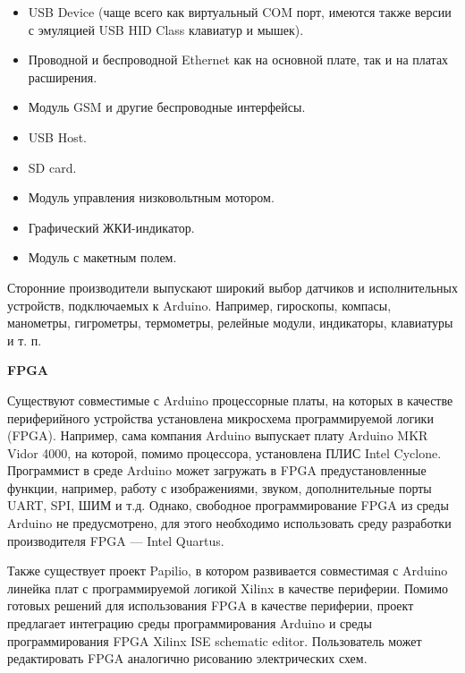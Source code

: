 \documentclass[12pt, oneside]{altsu-report}
\begin{document}
\begin{itemize}
    \item USB Device (чаще всего как виртуальный COM порт, имеются также версии с эмуляцией USB HID Class клавиатур и мышек).

    \item Проводной и беспроводной Ethernet как на основной плате, так и на платах расширения.

    \item Модуль GSM и другие беспроводные интерфейсы.

    \item USB Host.

    \item SD card.

    \item Модуль управления низковольтным мотором.

    \item Графический ЖКИ-индикатор.

    \item Модуль с макетным полем.
\end{itemize}

Сторонние производители выпускают широкий выбор датчиков и исполнительных устройств, подключаемых к Arduino. Например, гироскопы, компасы, манометры, гигрометры, термометры, релейные модули, индикаторы, клавиатуры и т. п.

\begin{center}
    \textbf{FPGA}
\end{center}

Существуют совместимые с Arduino процессорные платы, на которых в качестве периферийного устройства установлена микросхема программируемой логики (FPGA). Например, сама компания Arduino выпускает плату Arduino MKR Vidor 4000, на которой, помимо процессора, установлена ПЛИС Intel Cyclone. Программист в среде Arduino может загружать в FPGA предустановленные функции, например, работу с изображениями, звуком, дополнительные порты UART, SPI, ШИМ и т.д. Однако, свободное программирование FPGA из среды Arduino не предусмотрено, для этого необходимо использовать среду разработки производителя FPGA --- Intel Quartus.

Также существует проект Papilio, в котором развивается совместимая с Arduino линейка плат с программируемой логикой Xilinx в качестве периферии. Помимо готовых решений для использования FPGA в качестве периферии, проект предлагает интеграцию среды программирования Arduino и среды программирования FPGA Xilinx ISE schematic editor. Пользователь может редактировать FPGA аналогично рисованию электрических схем.
\end{document}
